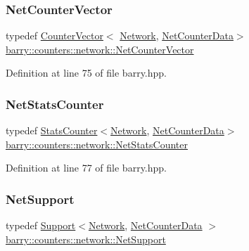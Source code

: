 \subsubsection{\texorpdfstring{Net\+Counter\+Vector}{NetCounterVector}}
{\footnotesize\ttfamily typedef \hyperlink{classbarry_1_1_counter_vector}{Counter\+Vector}$<$ \hyperlink{namespacebarry_1_1counters_1_1network_a4cb88d4572ded3b447ea269c9cd0b2c0}{Network}, \hyperlink{classbarry_1_1counters_1_1network_1_1_net_counter_data}{Net\+Counter\+Data}$>$ \hyperlink{namespacebarry_1_1counters_1_1network_a3b3c590303d47840d1967372ae495d95}{barry\+::counters\+::network\+::\+Net\+Counter\+Vector}}



Definition at line 75 of file barry.\+hpp.

\mbox{\label{namespacebarry_1_1counters_1_1network_ae26c399917113fe280b3f2859376b8b9}} 
\subsubsection{\texorpdfstring{Net\+Stats\+Counter}{NetStatsCounter}}
{\footnotesize\ttfamily typedef \hyperlink{classbarry_1_1_stats_counter}{Stats\+Counter}$<$\hyperlink{namespacebarry_1_1counters_1_1network_a4cb88d4572ded3b447ea269c9cd0b2c0}{Network}, \hyperlink{classbarry_1_1counters_1_1network_1_1_net_counter_data}{Net\+Counter\+Data}$>$ \hyperlink{namespacebarry_1_1counters_1_1network_ae26c399917113fe280b3f2859376b8b9}{barry\+::counters\+::network\+::\+Net\+Stats\+Counter}}



Definition at line 77 of file barry.\+hpp.

\mbox{\label{namespacebarry_1_1counters_1_1network_a4d30be7f465efd7d218f0264f8386b32}} 
\subsubsection{\texorpdfstring{Net\+Support}{NetSupport}}
{\footnotesize\ttfamily typedef \hyperlink{classbarry_1_1_support}{Support}$<$\hyperlink{namespacebarry_1_1counters_1_1network_a4cb88d4572ded3b447ea269c9cd0b2c0}{Network}, \hyperlink{classbarry_1_1counters_1_1network_1_1_net_counter_data}{Net\+Counter\+Data} $>$ \hyperlink{namespacebarry_1_1counters_1_1network_a4d30be7f465efd7d218f0264f8386b32}{barry\+::counters\+::network\+::\+Net\+Support}}



